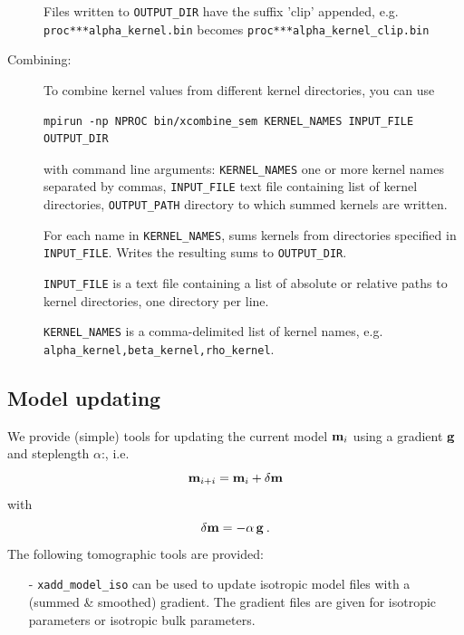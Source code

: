 \begin{description}
Files written to \texttt{OUTPUT\_DIR} have the suffix 'clip' appended,
e.g. \texttt{proc***alpha\_kernel.bin} becomes \texttt{proc***alpha\_kernel\_clip.bin}

\item [Combining:] To combine kernel values from different kernel directories, you can use
\begin{verbatim}
mpirun -np NPROC bin/xcombine_sem KERNEL_NAMES INPUT_FILE OUTPUT_DIR
\end{verbatim}
with command line arguments:
\texttt{KERNEL\_NAMES} one or more kernel names separated by commas,
\texttt{INPUT\_FILE} text file containing list of kernel directories,
\texttt{OUTPUT\_PATH} directory to which summed kernels are written.\newline

For each name in \texttt{KERNEL\_NAMES}, sums kernels from directories specified in
\texttt{INPUT\_FILE}. Writes the resulting sums to \texttt{OUTPUT\_DIR}.\newline

\texttt{INPUT\_FILE} is a text file containing a list of absolute or relative paths to
kernel directories, one directory per line.\newline

\texttt{KERNEL\_NAMES} is a comma-delimited list of kernel names,
e.g. \texttt{alpha\_kernel,beta\_kernel,rho\_kernel}.



\end{description}

\subsection{Model updating}
We provide (simple) tools for updating the current model $\mathbf{m}_i$ using a gradient $\mathbf{g}$ and steplength $\alpha$:, i.e.
\begin{equation}
\mathbf{m}_{i+i} = \mathbf{m}_i + \delta \mathbf{m}  \nonumber
\end{equation}
with
\begin{equation}
\delta \mathbf{m} = - \alpha \, \mathbf{g} \nonumber \: .
\end{equation}
\noindent
The following tomographic tools are provided:
\begin{enumerate}
\item [-] \texttt{xadd\_model\_iso} can be used to update isotropic model files with a (summed \& smoothed) gradient.
The gradient files are given for isotropic parameters or isotropic bulk parameters.

\end{enumerate}

